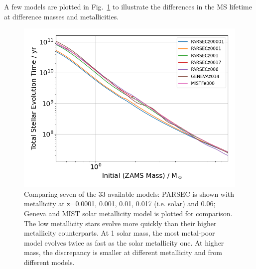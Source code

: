 \documentclass[fleqn,usenatbib]{rasti}
\begin{document}
A few models are plotted in Fig.~\ref{fig:total_stellar_lifetime} to
illustrate the differences in the MS lifetime at difference masses and
metallicities.

\begin{figure}
    \centering
    \includegraphics[width=\columnwidth]{fig_05_total_stellar_lifetime.png}
    \caption{Comparing seven of the 33 available models: PARSEC is shown with
    metallicity at z=0.0001, 0.001, 0.01, 0.017 (i.e. solar) and 0.06; Geneva
    and MIST solar metallicity model is plotted for comparison. The low
    metallicity stars evolve more quickly than their higher metallicity counterparts.
    At 1 solar mass, the most metal-poor model evolves twice as fast as the
    solar metallicity one. At higher mass, the discrepancy is smaller at
    different metallicity and from different models.}
    \label{fig:total_stellar_lifetime}
\end{figure}
\end{document}
